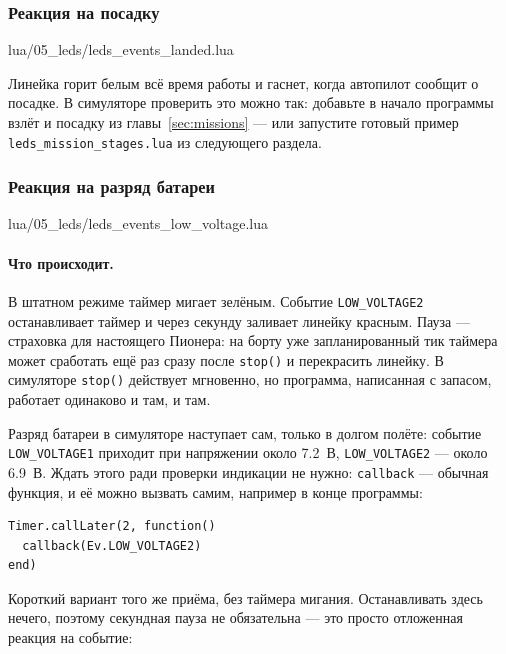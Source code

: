 \subsubsection*{Реакция на посадку}

\begin{codefile}{lua/05_leds/leds_events_landed.lua}
\end{codefile}

Линейка горит белым всё время работы и гаснет, когда автопилот сообщит о посадке. В симуляторе проверить это можно так: добавьте в начало программы взлёт и посадку из главы~\ref{sec:missions} --- или запустите готовый пример \texttt{leds\_mission\_stages.lua} из следующего раздела.

\subsubsection*{Реакция на разряд батареи}

\begin{codefile}{lua/05_leds/leds_events_low_voltage.lua}
\end{codefile}

\paragraph{Что происходит.} В штатном режиме таймер мигает зелёным. Событие \verb|LOW_VOLTAGE2| останавливает таймер и через секунду заливает линейку красным. Пауза --- страховка для настоящего Пионера: на борту уже запланированный тик таймера может сработать ещё раз сразу после \verb|stop()| и перекрасить линейку. В симуляторе \verb|stop()| действует мгновенно, но программа, написанная с запасом, работает одинаково и там, и там.

Разряд батареи в симуляторе наступает сам, только в долгом полёте: событие \verb|LOW_VOLTAGE1| приходит при напряжении около 7.2~В, \verb|LOW_VOLTAGE2| --- около 6.9~В. Ждать этого ради проверки индикации не нужно: \verb|callback| --- обычная функция, и её можно вызвать самим, например в конце программы:

\begin{codebox}
\begin{verbatim}
Timer.callLater(2, function()
  callback(Ev.LOW_VOLTAGE2)
end)
\end{verbatim}
\end{codebox}

Короткий вариант того же приёма, без таймера мигания. Останавливать здесь нечего, поэтому секундная пауза не обязательна --- это просто отложенная реакция на событие:

